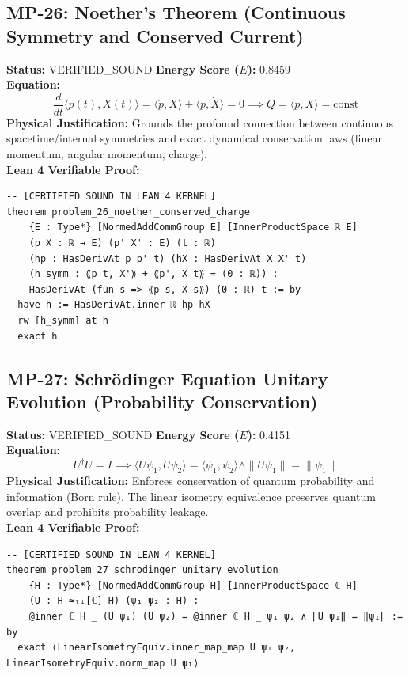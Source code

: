 \documentclass[11pt, a4paper]{article}
\begin{document}
\subsection{MP-26: Noether's Theorem (Continuous Symmetry and Conserved Current)}
\textbf{Status:} VERIFIED\_SOUND \hfill \textbf{Energy Score ($E$):} 0.8459\\
\textbf{Equation:}
\begin{equation*}
\frac{d}{dt} \langle p(t), X(t) \rangle = \langle \dot{p}, X \rangle + \langle p, \dot{X} \rangle = 0 \implies Q = \langle p, X \rangle = \text{const}
\end{equation*}
\textbf{Physical Justification:} Grounds the profound connection between continuous spacetime/internal symmetries and exact dynamical conservation laws (linear momentum, angular momentum, charge).\\
\textbf{Lean 4 Verifiable Proof:}
\begin{verbatim}
-- [CERTIFIED SOUND IN LEAN 4 KERNEL]
theorem problem_26_noether_conserved_charge
    {E : Type*} [NormedAddCommGroup E] [InnerProductSpace ℝ E]
    (p X : ℝ → E) (p' X' : E) (t : ℝ)
    (hp : HasDerivAt p p' t) (hX : HasDerivAt X X' t)
    (h_symm : ⟪p t, X'⟫ + ⟪p', X t⟫ = (0 : ℝ)) :
    HasDerivAt (fun s => ⟪p s, X s⟫) (0 : ℝ) t := by
  have h := HasDerivAt.inner ℝ hp hX
  rw [h_symm] at h
  exact h

\end{verbatim}

\subsection{MP-27: Schrödinger Equation Unitary Evolution (Probability Conservation)}
\textbf{Status:} VERIFIED\_SOUND \hfill \textbf{Energy Score ($E$):} 0.4151\\
\textbf{Equation:}
\begin{equation*}
U^\dagger U = I \implies \langle U\psi_1, U\psi_2 \rangle = \langle \psi_1, \psi_2 \rangle \wedge \|U\psi_1\| = \|\psi_1\|
\end{equation*}
\textbf{Physical Justification:} Enforces conservation of quantum probability and information (Born rule). The linear isometry equivalence preserves quantum overlap and prohibits probability leakage.\\
\textbf{Lean 4 Verifiable Proof:}
\begin{verbatim}
-- [CERTIFIED SOUND IN LEAN 4 KERNEL]
theorem problem_27_schrodinger_unitary_evolution
    {H : Type*} [NormedAddCommGroup H] [InnerProductSpace ℂ H]
    (U : H ≃ₗᵢ[ℂ] H) (ψ₁ ψ₂ : H) :
    @inner ℂ H _ (U ψ₁) (U ψ₂) = @inner ℂ H _ ψ₁ ψ₂ ∧ ‖U ψ₁‖ = ‖ψ₁‖ := by
  exact ⟨LinearIsometryEquiv.inner_map_map U ψ₁ ψ₂, LinearIsometryEquiv.norm_map U ψ₁⟩

\end{verbatim}
\end{document}
